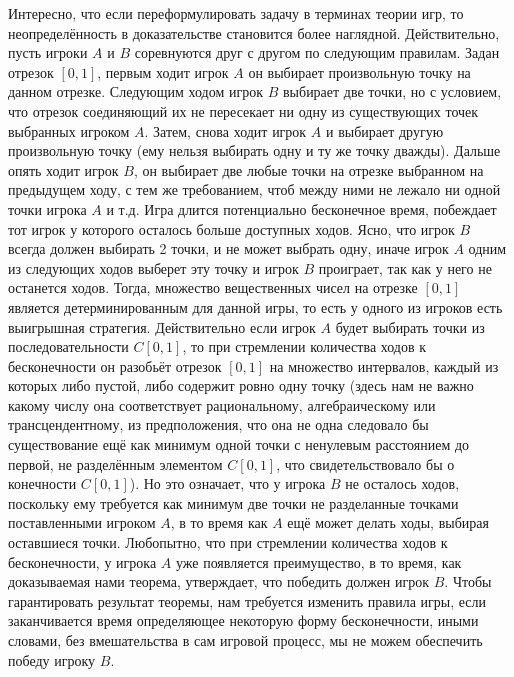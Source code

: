 \documentclass[12pt]{article}
\begin{document}
Интересно, что если переформулировать задачу в терминах теории игр, то неопределённость в доказательстве становится более наглядной. Действительно, пусть игроки $A$ и $B$ соревнуются друг с другом по следующим правилам. Задан отрезок $[0, 1]$, первым ходит игрок $A$ он выбирает произвольную точку на данном отрезке. Следующим ходом игрок $B$ выбирает две точки, но с условием, что отрезок соединяющий их не пересекает ни одну из существующих точек выбранных игроком $A$. Затем, снова ходит игрок $A$ и выбирает другую произвольную точку (ему нельзя выбирать одну и ту же точку дважды). Дальше опять ходит игрок $B$, он выбирает две любые точки на отрезке выбранном на предыдущем ходу, с тем же требованием, чтоб между ними не лежало ни одной точки игрока $A$ и т.д. Игра длится потенциально бесконечное время, побеждает тот игрок у которого осталось больше доступных ходов. Ясно, что игрок $B$ всегда должен выбирать 2 точки, и не может выбрать одну, иначе игрок $A$ одним из следующих ходов выберет эту точку и игрок $B$ проиграет, так как у него не останется ходов. Тогда, множество вещественных чисел на отрезке $[0, 1]$ является детерминированным для данной игры, то есть у одного из игроков есть выигрышная стратегия. Действительно если игрок $A$ будет выбирать точки из последовательности $C[0, 1]$, то при стремлении количества ходов к бесконечности он разобьёт отрезок $[0, 1]$ на множество интервалов, каждый из которых либо пустой, либо содержит ровно одну точку (здесь нам не важно какому числу она соответствует рациональному, алгебраическому или трансцендентному, из предположения, что она не одна следовало бы существование ещё как минимум одной точки с ненулевым расстоянием до первой, не разделённым элементом $C[0, 1]$, что свидетельствовало бы о конечности $C[0, 1]$). Но это означает, что у игрока $B$ не осталось ходов, поскольку ему требуется как минимум две точки не разделанные точками поставленными игроком $A$, в то время как $A$ ещё может делать ходы, выбирая оставшиеся точки. Любопытно, что при стремлении количества ходов к бесконечности, у игрока $A$ уже появляется преимущество, в то время, как доказываемая нами теорема, утверждает, что победить должен игрок $B$. Чтобы гарантировать результат теоремы, нам требуется изменить правила игры, если заканчивается время определяющее некоторую форму бесконечности, иными словами, без вмешательства в сам игровой процесс, мы не можем обеспечить победу игроку $B$.
\end{document}
